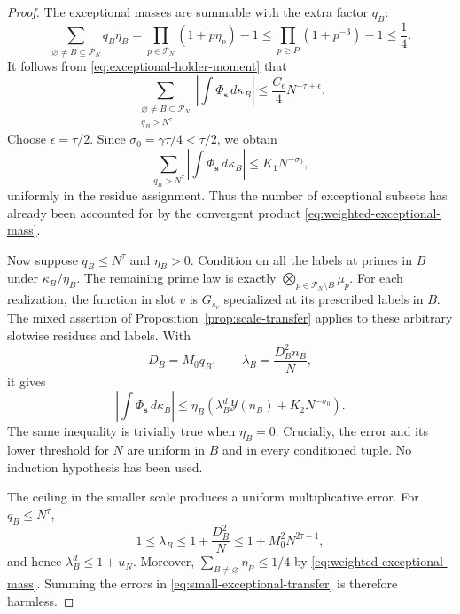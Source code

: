 \begin{proof}
The exceptional masses are summable with the extra factor $q_B$:
\begin{equation}
 \sum_{\varnothing\ne B\subseteq\mathcal P_N}q_B\eta_B
 =\prod_{p\in\mathcal P_N}(1+p\eta_p)-1
 \le\prod_{p\ge P}(1+p^{-3})-1\le\frac14.
 \label{eq:weighted-exceptional-mass}
\end{equation}
It follows from \eqref{eq:exceptional-holder-moment} that
\[
 \sum_{\substack{\varnothing\ne B\subseteq\mathcal P_N\\q_B>N^\tau}}
   \left|\int\Phi_{\mathbf s}\,d\kappa_B\right|
 \le\frac{C_\epsilon}{4}N^{-\tau+\epsilon}.
\]
Choose $\epsilon=\tau/2$.  Since $\sigma_0=\gamma\tau/4<\tau/2$, we obtain
\begin{equation}
 \sum_{q_B>N^\tau}
   \left|\int\Phi_{\mathbf s}\,d\kappa_B\right|
 \le K_1N^{-\sigma_0},
 \label{eq:large-exceptional-tail}
\end{equation}
uniformly in the residue assignment.  Thus the number of exceptional subsets
has already been accounted for by the convergent product
\eqref{eq:weighted-exceptional-mass}.

Now suppose $q_B\le N^\tau$ and $\eta_B>0$.  Condition on all the labels at
primes in $B$ under $\kappa_B/\eta_B$.  The remaining prime law is exactly
$\bigotimes_{p\in\mathcal P_N\setminus B}\mu_p$.  For each realization, the
function in slot $v$ is $G_{s_v}$ specialized at its prescribed labels in $B$.
The mixed assertion of Proposition~\ref{prop:scale-transfer} applies to these
arbitrary slotwise residues and labels.  With
\[
 D_B=M_0q_B,\qquad \lambda_B=\frac{D_B^2n_B}{N},
\]
it gives
\begin{equation}
 \left|\int\Phi_{\mathbf s}\,d\kappa_B\right|
 \le\eta_B\left(\lambda_B^d\mathcal Y(n_B)+K_2N^{-\sigma_0}\right).
 \label{eq:small-exceptional-transfer}
\end{equation}
The same inequality is trivially true when $\eta_B=0$.  Crucially, the error
and its lower threshold for $N$ are uniform in $B$ and in every conditioned
tuple.  No induction hypothesis has been used.

The ceiling in the smaller scale produces a uniform multiplicative error.
For $q_B\le N^\tau$,
\[
 1\le\lambda_B\le1+\frac{D_B^2}{N}
       \le1+M_0^2N^{2\tau-1},
\]
and hence $\lambda_B^d\le1+u_N$.  Moreover,
$\sum_{B\ne\varnothing}\eta_B\le1/4$ by
\eqref{eq:weighted-exceptional-mass}.  Summing the errors in
\eqref{eq:small-exceptional-transfer} is therefore harmless.


\end{proof}

